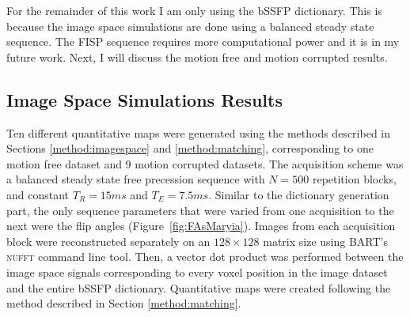 \hfill

For the remainder of this work I am only using the bSSFP dictionary.
This is because the image space simulations are done using a balanced steady state sequence.
The FISP sequence requires more computational power and it is in my future work.
Next, I will discuss the motion free and motion corrupted results.

\clearpage
\subsection{Image Space Simulations Results}

Ten different quantitative maps were generated using the methods described in Sections \ref{method:imagespace} and \ref{method:matching}, corresponding to one motion free dataset and 9 motion corrupted datasets.
The acquisition scheme was a balanced steady state free precession sequence with $N = 500$ repetition blocks, and constant $T_R = 15ms$ and $T_E = 7.5ms$.
Similar to the dictionary generation part, the only sequence parameters that were varied from one acquisition to the next were the flip angles (Figure~\ref{fig:FAsMaryia}).
Images from each acquisition block were reconstructed separately on an $128 \times 128$ matrix size using BART's \textsc{nufft} command line tool.
Then, a vector dot product was performed between the image space signals corresponding to every voxel position in the image dataset and the entire bSSFP dictionary.
Quantitative maps were created following the method described in Section \ref{method:matching}.

